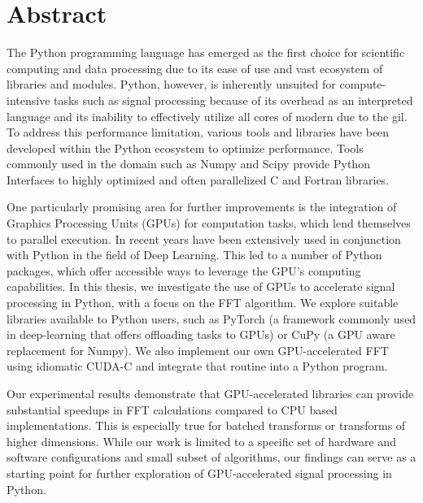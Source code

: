 \section*{Abstract}
The Python programming language has emerged as the first choice for scientific computing and data processing due to its ease of use and vast ecosystem of libraries and modules.
Python, however, is inherently unsuited for compute-intensive tasks such as signal processing because of its overhead as an interpreted language and its inability to effectively
utilize all cores of modern  due to the \acrfull{gil}.
To address this performance limitation, various tools and libraries have been developed within the Python ecosystem to optimize performance.
Tools commonly used in the domain such as Numpy and Scipy provide Python Interfaces to highly optimized and often parallelized C and Fortran libraries.

One particularly promising area for further improvements is the integration of Graphics Processing Units (GPUs) for computation tasks, which lend themselves to parallel execution.
In recent years  have been extensively used in conjunction with Python in the field of Deep Learning.
This led to a number of Python packages, which offer accessible ways to leverage the GPU's computing capabilities.
In this thesis, we investigate the use of GPUs to accelerate signal processing in Python, with a focus on the FFT algorithm.
We explore suitable libraries available to Python users, such as PyTorch (a framework commonly used in deep-learning that offers offloading tasks to GPUs) or CuPy (a GPU aware replacement for Numpy).
We also implement our own GPU-accelerated FFT using idiomatic CUDA-C and integrate that routine into a Python program.

Our experimental results demonstrate that GPU-accelerated libraries can provide substantial speedups in FFT calculations compared to CPU based implementations.
This is especially true for batched transforms or transforms of higher dimensions.
While our work is limited to a specific set of hardware and software configurations and small subset of algorithms, our findings can serve as a starting point for further exploration of GPU-accelerated signal processing in Python.
\newpage
\setcounter{tocdepth}{4}
\setcounter{secnumdepth}{4}
\tableofcontents
\renewcommand{\arraystretch}{2} %

